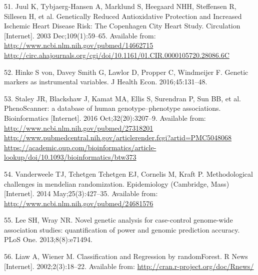 \documentclass[]{article}
\begin{document}
\hypertarget{ref-Juul2003}{}
51. Juul K, Tybjaerg-Hansen A, Marklund S, Heegaard NHH, Steffensen R,
Sillesen H, et al. Genetically Reduced Antioxidative Protection and
Increased Ischemic Heart Disease Risk: The Copenhagen City Heart Study.
Circulation {[}Internet{]}. 2003 Dec;109(1):59--65. Available from:
\href{http://www.ncbi.nlm.nih.gov/pubmed/14662715\%20http://circ.ahajournals.org/cgi/doi/10.1161/01.CIR.0000105720.28086.6C}{http://www.ncbi.nlm.nih.gov/pubmed/14662715 http://circ.ahajournals.org/cgi/doi/10.1161/01.CIR.0000105720.28086.6C}

\hypertarget{ref-VonHinke2016}{}
52. Hinke S von, Davey Smith G, Lawlor D, Propper C, Windmeijer F.
Genetic markers as instrumental variables. J Health Econ.
2016;45:131--48.

\hypertarget{ref-Staley2016}{}
53. Staley JR, Blackshaw J, Kamat MA, Ellis S, Surendran P, Sun BB, et
al. PhenoScanner: a database of human genotype--phenotype associations.
Bioinformatics {[}Internet{]}. 2016 Oct;32(20):3207--9. Available from:
\href{http://www.ncbi.nlm.nih.gov/pubmed/27318201\%20http://www.pubmedcentral.nih.gov/articlerender.fcgi?artid=PMC5048068\%20https://academic.oup.com/bioinformatics/article-lookup/doi/10.1093/bioinformatics/btw373}{http://www.ncbi.nlm.nih.gov/pubmed/27318201 http://www.pubmedcentral.nih.gov/articlerender.fcgi?artid=PMC5048068 https://academic.oup.com/bioinformatics/article-lookup/doi/10.1093/bioinformatics/btw373}

\hypertarget{ref-Vanderweele2014}{}
54. Vanderweele TJ, Tchetgen Tchetgen EJ, Cornelis M, Kraft P.
Methodological challenges in mendelian randomization. Epidemiology
(Cambridge, Mass) {[}Internet{]}. 2014 May;25(3):427--35. Available
from: \url{http://www.ncbi.nlm.nih.gov/pubmed/24681576}

\hypertarget{ref-Lee2013c}{}
55. Lee SH, Wray NR. Novel genetic analysis for case-control genome-wide
association studies: quantification of power and genomic prediction
accuracy. PLoS One. 2013;8(8):e71494.

\hypertarget{ref-Liaw2002}{}
56. Liaw A, Wiener M. Classification and Regression by randomForest. R
News {[}Internet{]}. 2002;2(3):18--22. Available from:
\url{http://cran.r-project.org/doc/Rnews/}
\end{document}
